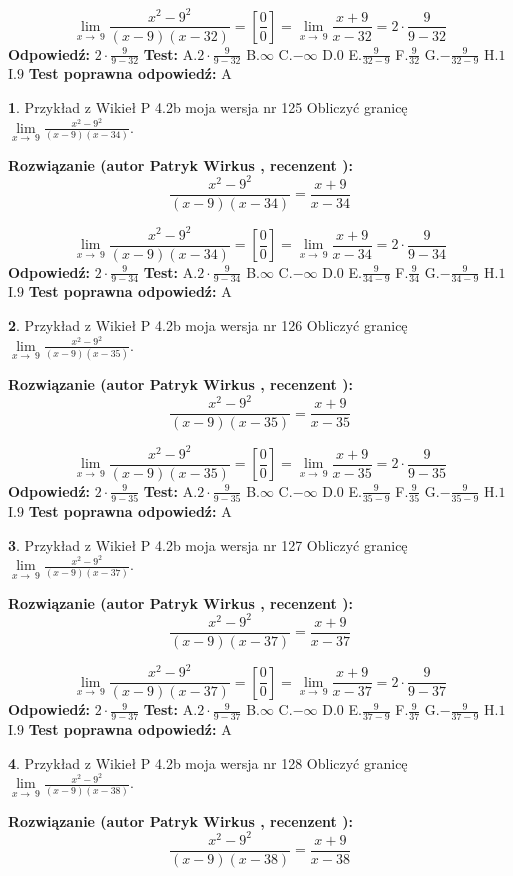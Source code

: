 \documentclass[12pt, a4paper]{article}
\theoremstyle{definition} %
\newtheorem{zad}{}
\newcommand{\zadStart}[1]{\begin{zad}#1\newline}
\newcommand{\zadStop}{\end{zad}}
\newcommand{\rozwStart}[2]{\noindent \textbf{Rozwiązanie (autor #1 , recenzent #2): }\newline}
\newcommand{\rozwStop}{\newline}
\newcommand{\odpStart}{\noindent \textbf{Odpowiedź:}\newline}
\newcommand{\odpStop}{\newline}
\newcommand{\testStart}{\noindent \textbf{Test:}\newline}
\newcommand{\testStop}{\newline}
\newcommand{\kluczStart}{\noindent \textbf{Test poprawna odpowiedź:}\newline}
\newcommand{\kluczStop}{\newline}
\begin{document}
$$\lim\limits_{x\to\ 9}\frac{x^{2}-9^{2}}{(x-9)(x-32)}=[\frac{0}{0}]=\lim\limits_{x\to\ 9}\frac{x+9}{x-32}=2 \cdot \frac{9}{9-32}$$
\rozwStop
\odpStart
$2 \cdot \frac{9}{9-32}$
\odpStop
\testStart
A.$2 \cdot \frac{9}{9-32}$
B.$\infty$
C.$-\infty$
D.$0$
E.$\frac{9}{32-9}$
F.$\frac{9}{32}$
G.$-\frac{9}{32-9}$
H.$1$
I.$9$
\testStop
\kluczStart
A
\kluczStop



\zadStart{Przykład z Wikieł P 4.2b moja wersja nr 125}
Obliczyć granicę $\lim\limits_{x\to\ 9}\frac{x^{2}-9^{2}}{(x-9)(x-34)}$.
\zadStop
\rozwStart{Patryk Wirkus}{}
$$\frac{x^{2}-9^{2}}{(x-9)(x-34)}=\frac{x+9}{x-34}$$

$$\lim\limits_{x\to\ 9}\frac{x^{2}-9^{2}}{(x-9)(x-34)}=[\frac{0}{0}]=\lim\limits_{x\to\ 9}\frac{x+9}{x-34}=2 \cdot \frac{9}{9-34}$$
\rozwStop
\odpStart
$2 \cdot \frac{9}{9-34}$
\odpStop
\testStart
A.$2 \cdot \frac{9}{9-34}$
B.$\infty$
C.$-\infty$
D.$0$
E.$\frac{9}{34-9}$
F.$\frac{9}{34}$
G.$-\frac{9}{34-9}$
H.$1$
I.$9$
\testStop
\kluczStart
A
\kluczStop



\zadStart{Przykład z Wikieł P 4.2b moja wersja nr 126}
Obliczyć granicę $\lim\limits_{x\to\ 9}\frac{x^{2}-9^{2}}{(x-9)(x-35)}$.
\zadStop
\rozwStart{Patryk Wirkus}{}
$$\frac{x^{2}-9^{2}}{(x-9)(x-35)}=\frac{x+9}{x-35}$$

$$\lim\limits_{x\to\ 9}\frac{x^{2}-9^{2}}{(x-9)(x-35)}=[\frac{0}{0}]=\lim\limits_{x\to\ 9}\frac{x+9}{x-35}=2 \cdot \frac{9}{9-35}$$
\rozwStop
\odpStart
$2 \cdot \frac{9}{9-35}$
\odpStop
\testStart
A.$2 \cdot \frac{9}{9-35}$
B.$\infty$
C.$-\infty$
D.$0$
E.$\frac{9}{35-9}$
F.$\frac{9}{35}$
G.$-\frac{9}{35-9}$
H.$1$
I.$9$
\testStop
\kluczStart
A
\kluczStop



\zadStart{Przykład z Wikieł P 4.2b moja wersja nr 127}
Obliczyć granicę $\lim\limits_{x\to\ 9}\frac{x^{2}-9^{2}}{(x-9)(x-37)}$.
\zadStop
\rozwStart{Patryk Wirkus}{}
$$\frac{x^{2}-9^{2}}{(x-9)(x-37)}=\frac{x+9}{x-37}$$

$$\lim\limits_{x\to\ 9}\frac{x^{2}-9^{2}}{(x-9)(x-37)}=[\frac{0}{0}]=\lim\limits_{x\to\ 9}\frac{x+9}{x-37}=2 \cdot \frac{9}{9-37}$$
\rozwStop
\odpStart
$2 \cdot \frac{9}{9-37}$
\odpStop
\testStart
A.$2 \cdot \frac{9}{9-37}$
B.$\infty$
C.$-\infty$
D.$0$
E.$\frac{9}{37-9}$
F.$\frac{9}{37}$
G.$-\frac{9}{37-9}$
H.$1$
I.$9$
\testStop
\kluczStart
A
\kluczStop



\zadStart{Przykład z Wikieł P 4.2b moja wersja nr 128}
Obliczyć granicę $\lim\limits_{x\to\ 9}\frac{x^{2}-9^{2}}{(x-9)(x-38)}$.
\zadStop
\rozwStart{Patryk Wirkus}{}
$$\frac{x^{2}-9^{2}}{(x-9)(x-38)}=\frac{x+9}{x-38}$$
\end{document}
